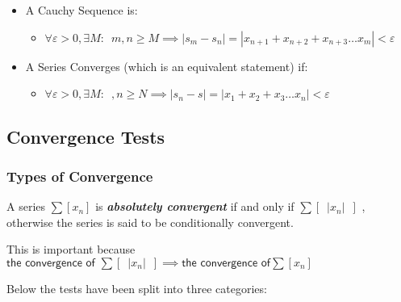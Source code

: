 \documentclass[
]{article}
\begin{document}
\begin{itemize}
\item
  A Cauchy Sequence is:

  \begin{itemize}
  \item
    \(\forall \varepsilon > 0, \exists M : \enspace m,n \geq M \implies \mid s_m -s_n \mid = \left| x_{n+1} + x_{n+2} + x_{n+3} \dots x_m \right| < \varepsilon\)
  \end{itemize}
\item
  A Series Converges (which is an equivalent statement) if:

  \begin{itemize}
  \item
    \(\forall \varepsilon > 0, \exists M : \enspace ,n \geq N \implies \mid s_n -s \mid = \left| x_{1} + x_{2} + x_{3} \dots x_n \right| < \varepsilon\)
  \end{itemize}
\end{itemize}


\newpage
\hypertarget{header-n3182}{%
\subsection{Convergence Tests}\label{header-n3182}}

\hypertarget{header-n3183}{%
\subsubsection{Types of Convergence}\label{header-n3183}}

A series \(\sum [x_n]\) is \textbf{\emph{absolutely convergent}} if and
only if \(\sum \left[  \enspace \left| x_n \right| \enspace \right]\) ,
otherwise the series is said to be conditionally convergent.

This is important because
\(\textsf{the convergence of } \sum \left[  \enspace \left| x_n \right| \enspace \right] \implies \textsf{the convergence of} \sum [x_n]\)

Below the tests have been split into three categories:
\end{document}
